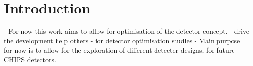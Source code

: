 \chapter{Introduction} %
\label{chap:introduction} %
\setcounter{page}{17}  %

\begin{comment} %
Tell them what you are going to tell them
\end{comment}

- For now this work aims to allow for optimisation of the \chips detector concept.
- drive the development help others
- for detector optimisation studies
- Main purpose for now is to allow for the exploration of different detector designs, for future
CHIPS detectors.